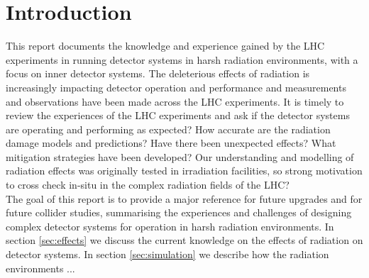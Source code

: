 \section{Introduction}
\label{sec:intro}

This report documents the knowledge and experience gained by the LHC experiments in running detector systems in harsh radiation environments, with a focus on inner detector systems. The deleterious effects of radiation is increasingly impacting detector operation and performance and measurements and observations have been made across the LHC experiments. It is timely to review the experiences of the LHC experiments and ask if the detector systems are operating and performing as expected? How accurate are the radiation damage models and predictions? Have there been unexpected effects? What mitigation strategies have been developed? Our understanding and modelling of radiation effects was originally tested in irradiation facilities, so strong motivation to cross check in-situ in the complex radiation fields of the LHC? \\

The goal of this report is to provide a major reference for future upgrades and for future collider studies, summarising the experiences and challenges of designing complex detector systems for operation in harsh radiation environments. In section \ref{sec:effects} we discuss the current knowledge on the effects of radiation on detector systems. In section \ref{sec:simulation} we describe how the radiation environments ...

